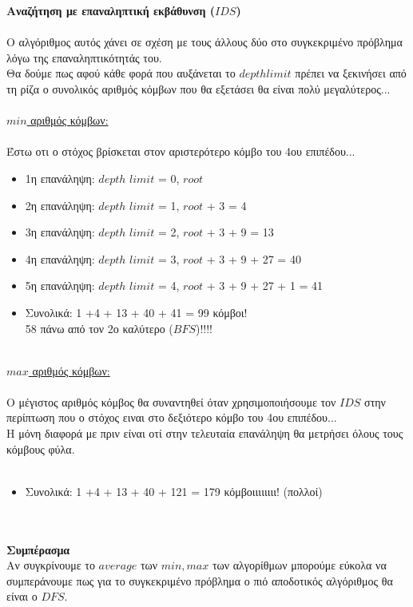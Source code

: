 \documentclass[12pt]{article}
\begin{document}
\textbf{Αναζήτηση με επαναληπτική εκβάθυνση ($IDS$)}\\\\
Ο αλγόριθμος αυτός χάνει σε σχέση με τους άλλους δύο στο συγκεκριμένο πρόβλημα λόγω της επαναληπτικότητάς του.\\
Θα δούμε πως αφού κάθε φορά που αυξάνεται το $depth limit$ πρέπει να ξεκινήσει από τη ρίζα ο συνολικός αριθμός κόμβων που θα εξετάσει θα είναι πολύ μεγαλύτερος...\\\\
\underline{$min$ αριθμός κόμβων:}\\\\
Έστω οτι ο στόχος βρίσκεται στον αριστερότερο κόμβο του 4ου επιπέδου...\\
\begin{itemize}
    \item 1η επανάληψη: $depth$ $limit$ = 0, $root$
    \item 2η επανάληψη: $depth$ $limit$ = 1, $root$ + 3 = 4 
    \item 3η επανάληψη: $depth$ $limit$ = 2, $root$ + 3 + 9 = 13
    \item 4η επανάληψη: $depth$ $limit$ = 3, $root$ + 3 + 9 + 27 = 40
    \item 5η επανάληψη: $depth$ $limit$ = 4, $root$ + 3 + 9 + 27 + 1 = 41
    \item Συνολικά: 1 +4 + 13 + 40 + 41 = 99 κόμβοι!\\
    58 πάνω από τον 2ο καλύτερο ($BFS$)!!!! \\\\
\end{itemize}
\underline{$max$ αριθμός κόμβων:}\\\\
Ο μέγιστος αριθμός κόμβος θα συναντηθεί όταν χρησιμοποιήσουμε τον $IDS$ στην περίπτωση που ο στόχος ειναι στο δεξιότερο κόμβο του 4ου επιπέδου...\\
Η μόνη διαφορά με πριν είναι οτί στην τελευταία επανάληψη θα μετρήσει όλους τους κόμβους φύλα.\\\\
\begin{itemize}
    \item Συνολικά: 1 +4 + 13 + 40 + 121 = 179 κόμβοιιιιιιιι! (πολλοί) \\\\\\
\end{itemize}
\textbf{Συμπέρασμα}\\
Αν συγκρίνουμε το $average$ των $min, max$ των αλγορίθμων μπορούμε εύκολα να συμπεράνουμε πως για το συγκεκριμένο πρόβλημα ο πιό αποδοτικός αλγόριθμος θα είναι ο $DFS$.\\\\
\end{document}
